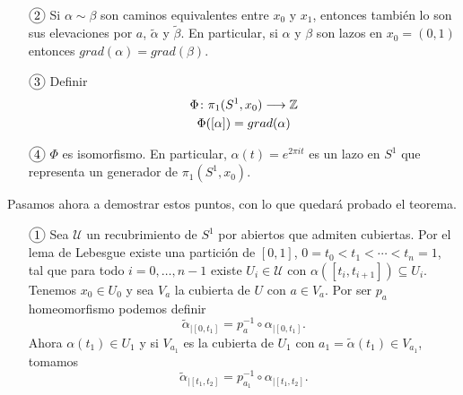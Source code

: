 \documentclass[GTS.tex]{subfiles}
\begin{document}
\begin{dem}
\begin{enumerate}
\item[$\circled{2}$] Si $\alpha\sim\beta$ son caminos equivalentes entre $x_0$ y $x_1$, entonces también lo son sus elevaciones por $a$, $\tilde{\alpha}$ y $\tilde{\beta}$. En particular, si $\alpha$ y $\beta$ son lazos en $x_0=(0,1)$ entonces $grad(\alpha)=grad(\beta)$.
\item[$\circled{3}$] Definir
\begin{gather*}
\Phi\colon{\pi_1(S^1,x_0)}\longrightarrow{\mathbb{Z}}\\
\Phi([\alpha])=grad(\alpha)
\end{gather*}
\item[$\circled{4}$] $\Phi$ es isomorfismo. En particular, $\alpha(t)=e^{2\pi it}$ es un lazo en $S^1$ que representa un generador de $\pi_1(S^1,x_0)$.
\end{enumerate}
Pasamos ahora a demostrar estos puntos, con lo que quedará probado el teorema.
\begin{enumerate}
\item[$\circled{1}$] Sea $\mathcal{U}$ un recubrimiento de $S^1$ por abiertos que admiten cubiertas. Por el lema de Lebesgue existe una partición de $[0,1]$, $0=t_0<t_1<\cdots<t_n=1$,  tal que para todo $i=0,\dots, n-1$ existe $U_i\in\mathcal{U}$ con  $\alpha([t_i,t_{i+1}])\subseteq U_i$. Tenemos $x_0\in U_0$ y sea $V_a$ la cubierta de $U$ con $a\in V_a$. Por ser $p_a$ homeomorfismo podemos definir
\[
\tilde{\alpha}_{\big|{[0,t_1]}}=p_a^{-1}\circ\alpha_{\big|[0,t_1]}.
\]
Ahora $\alpha(t_1)\in U_1$ y si $V_{a_1}$ es la cubierta de $U_1$ con $a_1=\tilde{\alpha}(t_1)\in V_{a_1}$, tomamos
\[
\tilde{\alpha}_{\big|{[t_1,t_2]}}=p_{a_1}^{-1}\circ\alpha_{\big|[t_1,t_2]}.
\]


\end{enumerate}
\end{dem}
\end{document}
